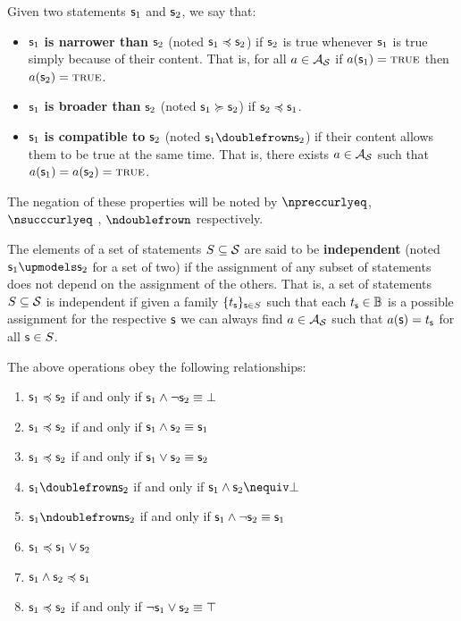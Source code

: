 	\begin{mathSection}
		
		\begin{defn}\label{pm-vs-defNarrownessAndCompatibility}
			Given two statements $\mathsf{s}_1$ and $\mathsf{s}_2$, we say that:
			\begin{itemize}
				\item $\mathsf{s}_1$ \textbf{is narrower than} $\mathsf{s}_2$ (noted $\mathsf{s}_1 \preccurlyeq \mathsf{s}_2$) if $\mathsf{s}_2$ is true whenever $\mathsf{s}_1$ is true simply because of their content. That is, for all $a \in \mathcal{A}_{\mathcal{S}}$ if $a(\mathsf{s}_1)=\textup{\textsc{true}}$ then $a(\mathsf{s}_2)=\textup{\textsc{true}}$.
				\item $\mathsf{s}_1$ \textbf{is broader than} $\mathsf{s}_2$ (noted $\mathsf{s}_1 \succcurlyeq \mathsf{s}_2$) if $\mathsf{s}_2 \preccurlyeq \mathsf{s}_1$.
				\item $\mathsf{s}_1$ \textbf{is compatible to} $\mathsf{s}_2$ (noted $\stmt_1 \comp \stmt_2$) if their content allows them to be true at the same time. That is, there exists $a \in \mathcal{A}_{\mathcal{S}}$ such that $a(\mathsf{s}_1)=a(\mathsf{s}_2)=\textup{\textsc{true}}$.
			\end{itemize}
			The negation of these properties will be noted by $\nnarrower$, $\nbroader$ , $\ncomp$ respectively.
		\end{defn}
		\begin{defn}\label{pm-vs-defStatementIndependence}
			The elements of a set of statements $S \subseteq \mathcal{S}$ are said to be \textbf{independent} (noted $\stmt_1 \indep \stmt_2$ for a set of two) if the assignment of any subset of statements does not depend on the assignment of the others. That is, a set of statements $S \subseteq \mathcal{S}$ is independent if given a family  $\{t_{\mathsf{s}}\}_{\mathsf{s} \in S}$ such that each $t_{\mathsf{s}} \in \mathbb{B}$ is a possible assignment for the respective $\mathsf{s}$ we can always find $a \in \mathcal{A}_{\mathcal{S}}$ such that $a(\mathsf{s}) = t_{\mathsf{s}}$ for all $\mathsf{s} \in S$.
		\end{defn}
		
		\begin{prop}\label{pm-vs-narrownessProperties}
			The above operations obey the following relationships:
			\begin{enumerate}[label=(\roman*)]
				\item 	$\mathsf{s}_1 \preccurlyeq \mathsf{s}_2$ if and only if $\mathsf{s}_1 \wedge \neg \mathsf{s}_2 \equiv \bot$
				\item 	$\mathsf{s}_1 \preccurlyeq \mathsf{s}_2$ if and only if $\mathsf{s}_1 \wedge \mathsf{s}_2 \equiv \mathsf{s}_1$
				\item 	$\mathsf{s}_1 \preccurlyeq \mathsf{s}_2$ if and only if $\mathsf{s}_1 \vee \mathsf{s}_2 \equiv \mathsf{s}_2$
				\item 	$\stmt_1 \comp \stmt_2$ if and only if $\stmt_1 \AND \stmt_2 \nequiv \impossibility$
				\item 	$\stmt_1 \ncomp \stmt_2$ if and only if $\mathsf{s}_1 \wedge \neg \mathsf{s}_2 \equiv \mathsf{s}_1$
				\item 	$\mathsf{s}_1 \preccurlyeq \mathsf{s}_1 \vee \mathsf{s}_2$
				\item 	$\mathsf{s}_1 \wedge \mathsf{s}_2 \preccurlyeq \mathsf{s}_1$
				\item 	$\mathsf{s}_1 \preccurlyeq \mathsf{s}_2$ if and only if $\neg \mathsf{s}_1 \vee \mathsf{s}_2 \equiv \top$
			\end{enumerate}	
		\end{prop}
		

\end{mathSection}
